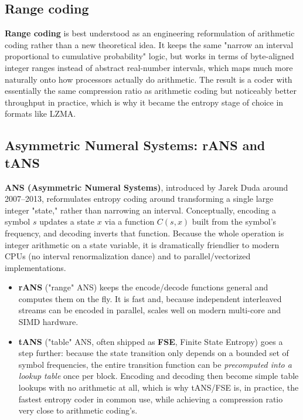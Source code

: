 \documentclass[11pt]{article}
\begin{document}
\subsection{Range coding}

\textbf{Range coding} is best understood as an engineering reformulation of arithmetic coding rather than a new theoretical idea. It keeps the same "narrow an interval proportional to cumulative probability" logic, but works in terms of byte-aligned integer ranges instead of abstract real-number intervals, which maps much more naturally onto how processors actually do arithmetic. The result is a coder with essentially the same compression ratio as arithmetic coding but noticeably better throughput in practice, which is why it became the entropy stage of choice in formats like LZMA.

\subsection{Asymmetric Numeral Systems: rANS and tANS}

\textbf{ANS (Asymmetric Numeral Systems)}, introduced by Jarek Duda around 2007--2013, reformulates entropy coding around transforming a single large integer "state," rather than narrowing an interval. Conceptually, encoding a symbol $s$ updates a state $x$ via a function $C(s,x)$ built from the symbol's frequency, and decoding inverts that function. Because the whole operation is integer arithmetic on a state variable, it is dramatically friendlier to modern CPUs (no interval renormalization dance) and to parallel/vectorized implementations.

\begin{itemize}[leftmargin=1.4em]
  \item \textbf{rANS} ("range" ANS) keeps the encode/decode functions general and computes them on the fly. It is fast and, because independent interleaved streams can be encoded in parallel, scales well on modern multi-core and SIMD hardware.
  \item \textbf{tANS} ("table" ANS, often shipped as \textbf{FSE}, Finite State Entropy) goes a step further: because the state transition only depends on a bounded set of symbol frequencies, the entire transition function can be \emph{precomputed into a lookup table} once per block. Encoding and decoding then become simple table lookups with no arithmetic at all, which is why tANS/FSE is, in practice, the fastest entropy coder in common use, while achieving a compression ratio very close to arithmetic coding's.
\end{itemize}
\end{document}
